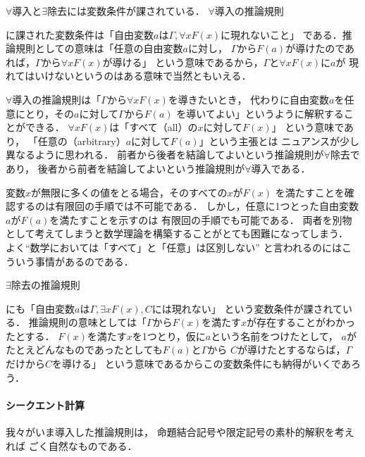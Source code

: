  $\forall$導入と$\exists$除去には変数条件が課されている．
 $\forall$導入の推論規則
 \begin{prooftree}
 \end{prooftree}
 に課された変数条件は「自由変数$a$は$\varGamma ,  \forall x F(x)$に現れないこと」
 である．推論規則としての意味は「任意の自由変数$a$に対し，
 $\varGamma$から$F(a)$が導けたのであれば，$\varGamma$から$\forall x F(x)$が導ける」
 という意味であるから，$\varGamma$と$\forall x F(x)$に$a$が
 現れてはいけないというのはある意味で当然ともいえる．

 $\forall$導入の推論規則は「$\varGamma$から$\forall x F(x)$を導きたいとき，
 代わりに自由変数$a$を任意にとり，その$a$に対して$\varGamma$から$F(a)$
 を導いてよい」というように解釈することができる．
 $\forall x F(x)$は「すべて（all）の$x$に対して$F(x)$」
 という意味であり，
 「任意の（arbitrary）$a$に対して$F(a)$」という主張とは
 ニュアンスが少し異なるように思われる．
 前者から後者を結論してよいという推論規則が$\forall$除去であり，
 後者から前者を結論してよいという推論規則が$\forall$導入である．

 変数$x$が無限に多くの値をとる場合，そのすべての$x$が$F(x)$
 を満たすことを確認するのは有限回の手順では不可能である．
 しかし，任意に1つとった自由変数$a$が$F(a)$を満たすことを示すのは
 有限回の手順でも可能である．
 両者を別物として考えてしまうと数学理論を構築することがとても困難になってしまう．
 よく``数学においては「すべて」と「任意」は区別しない''
 と言われるのにはこういう事情があるのである．

 $\exists$除去の推論規則
 \begin{prooftree}
 \end{prooftree}
 にも「自由変数$a$は$\varGamma ,  \exists x F(x),  C$には現れない」
 という変数条件が課されている．
 推論規則の意味としては「$\varGamma$から$F(x)$を満たす$x$が存在することがわかったとする．
 $F(x)$を満たす$x$を1つとり，仮に$a$という名前をつけたとして，
 $a$がたとえどんなものであったとしても$F(a)$と$\varGamma$から
 $C$が導けたとするならば，$\varGamma$だけから$C$を導ける」
 という意味であるからこの変数条件にも納得がいくであろう．


 \paragraph{シークエント計算}
 我々がいま導入した推論規則は，
 命題結合記号や限定記号の素朴的解釈を考えれば
 ごく自然なものである．

